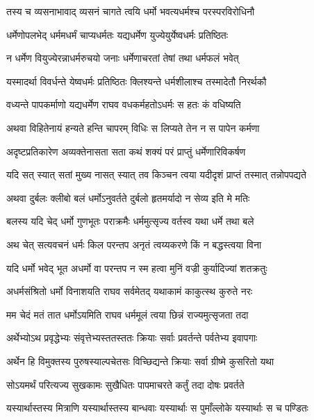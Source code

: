 \twolineshloka
{तस्य च व्यसनाभावाद् व्यसनं चागते त्वयि}
{धर्मो भवत्यधर्मश्च परस्परविरोधिनौ} %

\twolineshloka
{धर्मेणोपलभेद् धर्ममधर्मं चाप्यधर्मतः}
{यद्यधर्मेण युज्येयुर्येष्वधर्मः प्रतिष्ठितः} %

\twolineshloka
{न धर्मेण वियुज्येरन्नाधर्मरुचयो जनाः}
{धर्मेणाचरतां तेषां तथा धर्मफलं भवेत्} %

\twolineshloka
{यस्मादर्था विवर्धन्ते येष्वधर्मः प्रतिष्ठितः}
{क्लिश्यन्ते धर्मशीलाश्च तस्मादेतौ निरर्थकौ} %

\twolineshloka
{वध्यन्ते पापकर्माणो यद्यधर्मेण राघव}
{वधकर्महतोऽधर्मः स हतः कं वधिष्यति} %

\twolineshloka
{अथवा विहितेनायं हन्यते हन्ति चापरम्}
{विधिः स लिप्यते तेन न स पापेन कर्मणा} %

\twolineshloka
{अदृष्टप्रतिकारेण अव्यक्तेनासता सता}
{कथं शक्यं परं प्राप्तुं धर्मेणारिविकर्षण} %

\twolineshloka
{यदि सत् स्यात् सतां मुख्य नासत् स्यात् तव किञ्चन}
{त्वया यदीदृशं प्राप्तं तस्मात् तन्नोपपद्यते} %

\twolineshloka
{अथवा दुर्बलः क्लीबो बलं धर्मोऽनुवर्तते}
{दुर्बलो हृतमर्यादो न सेव्य इति मे मतिः} %

\twolineshloka
{बलस्य यदि चेद् धर्मो गुणभूतः पराक्रमैः}
{धर्ममुत्सृज्य वर्तस्व यथा धर्मे तथा बले} %

\twolineshloka
{अथ चेत् सत्यवचनं धर्मः किल परन्तप}
{अनृतं त्वय्यकरणे किं न बद्धस्त्वया विना} %

\twolineshloka
{यदि धर्मो भवेद् भूत अधर्मो वा परन्तप}
{न स्म हत्वा मुनिं वज्री कुर्यादिज्यां शतक्रतुः} %

\twolineshloka
{अधर्मसंश्रितो धर्मो विनाशयति राघव}
{सर्वमेतद् यथाकामं काकुत्स्थ कुरुते नरः} %

\twolineshloka
{मम चेदं मतं तात धर्मोऽयमिति राघव}
{धर्ममूलं त्वया छिन्नं राज्यमुत्सृजता तदा} %

\twolineshloka
{अर्थेभ्योऽथ प्रवृद्धेभ्यः संवृत्तेभ्यस्ततस्ततः}
{क्रियाः सर्वाः प्रवर्तन्ते पर्वतेभ्य इवापगाः} %

\twolineshloka
{अर्थेन हि विमुक्तस्य पुरुषस्याल्पचेतसः}
{विच्छिद्यन्ते क्रियाः सर्वा ग्रीष्मे कुसरितो यथा} %

\twolineshloka
{सोऽयमर्थं परित्यज्य सुखकामः सुखैधितः}
{पापमाचरते कर्तुं तदा दोषः प्रवर्तते} %

\twolineshloka
{यस्यार्थास्तस्य मित्राणि यस्यार्थास्तस्य बान्धवाः}
{यस्यार्थाः स पुमाँल्लोके यस्यार्थाः स च पण्डितः} %

